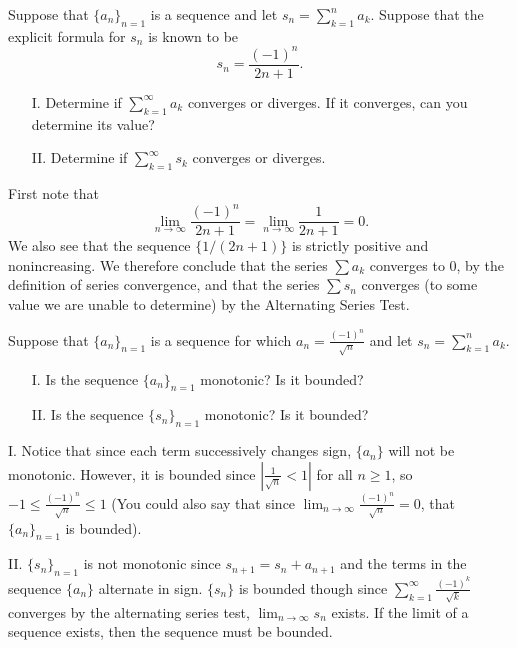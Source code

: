 \documentclass[noauthor]{ximera}
\begin{document}
\begin{problem}
Suppose that $\{a_n\}_{n=1}$ is a sequence and let $s_n = \sum_{k=1}^n a_k$.  Suppose that the explicit formula for $s_n$ is known to be
$$
s_n = \frac{(-1)^n}{2n+1}.
$$
\begin{itemize}
\item[I.] Determine if $\sum_{k=1}^{\infty} a_k$ converges or diverges.  If it converges, can you determine its value?
\item[II.] Determine if $\sum_{k=1}^{\infty} s_k$ converges or diverges.
\end{itemize}

\begin{freeResponse}
First note that 
$$
\lim_{n\rightarrow \infty} \frac{(-1)^n}{2n+1} = \lim_{n\rightarrow \infty} \frac{1}{2n+1} = 0.
$$
We also see that the sequence $\{1/(2n+1)\}$ is strictly positive and nonincreasing. We therefore conclude that the series $\sum a_k$ converges to $0$, by the definition of series convergence, and that the series $\sum s_n$ converges (to some value we are unable to determine) by the Alternating Series Test.
\end{freeResponse}
\end{problem}

\begin{problem}
Suppose that $\{a_n\}_{n=1}$ is a sequence for which $a_n = \frac{(-1)^n}{\sqrt{n}}$ and let $s_n = \sum_{k=1}^n a_k$.  
\begin{itemize}
\item[I.] Is the sequence $\{a_n\}_{n=1}$ monotonic?  Is it bounded?
\item[II.] Is the sequence $\{s_n\}_{n=1}$ monotonic?  Is it bounded?
\end{itemize}

\begin{freeResponse}
I. Notice that since each term successively changes sign, $\{a_n\}$ will not be monotonic.  However, it is bounded since $\left|\frac{1}{\sqrt{n}} <1\right|$ for all $n \geq 1$, so $-1 \leq  \frac{(-1)^n}{\sqrt{n}} \leq 1$ (You could also say that since $\lim_{n \to \infty} \frac{(-1)^n}{\sqrt{n}} =0$, that $\{a_n\}_{n=1}$ is bounded).

II. $\{s_n\}_{n=1}$ is not monotonic since $s_{n+1} =s_n +a_{n+1}$ and the terms in the sequence $\{a_n\}$ alternate in sign.  $\{s_n\}$ is bounded though since $\sum_{k=1}^{\infty} \frac{(-1)^k}{\sqrt{k}}$ converges by the alternating series test, $\lim_{n \to \infty} s_n$ exists.  If the limit of a sequence exists, then the sequence must be bounded.


\end{freeResponse}
\end{problem}
\end{document}
